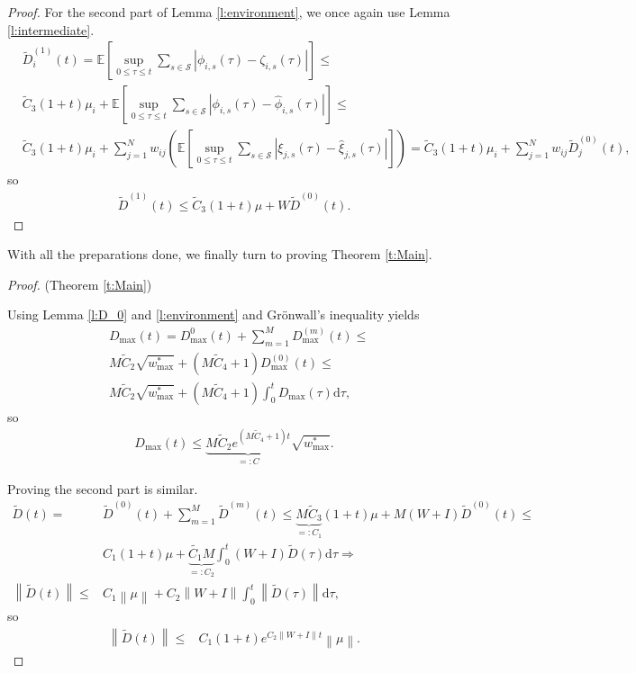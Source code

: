 \documentclass{article}
\newcommand{\E}{\mathbb{E}}
\renewcommand{\d}{\mathrm{d}}
\newcommand{\1}[1]{{\mathds{1}}_{\left\{#1\right\}}}
\renewcommand{\S}{\mathcal{S}}
\newcommand{\remm}[1]{{#1}}
\begin{document}
\begin{proof}
		For the second part of Lemma \ref{l:environment}, we once again use Lemma \ref{l:intermediate}.
		\begin{align*}
			&\tilde{D}_{i}^{(1)}(t)= \E \left[\sup_{0 \leq \tau \leq t} \sum_{s \in \S}  \left| \phi_{i,s}(\tau)-\zeta_{i,s}(\tau) \right| \right] \leq \\
			& \tilde{C}_3\remm{(1+t)}\mu_{i}+ \E \left[\sup_{0 \leq \tau \leq t} \sum_{s \in \S}  \left| \phi_{i,s}(\tau)-\hat{\phi}_{i,s}(\tau) \right| \right] \leq\\
			& \tilde{C}_3\remm{(1+t)}\mu_{i}+\sum_{j=1}^{N} w_{ij} \left( \E \left[\sup_{0 \leq \tau \leq t} \sum_{s \in \S}  \left| \xi_{j,s}(\tau)-\hat{\xi}_{j,s}(\tau) \right| \right] \right)=\tilde{C}_3\remm{(1+t)} \mu_i+\sum_{j=1}^N w_{ij}\tilde{D}_{j}^{(0)}(t),
		\end{align*}
		so
		\begin{align*}
			\tilde{D}^{(1)}(t) \leq \tilde{C}_3\remm{(1+t)} \mu+W \tilde{D}^{(0)}(t).
		\end{align*}
	\end{proof}	
	
	With all the preparations done, we finally turn to proving Theorem \ref{t:Main}.
	\begin{proof}(Theorem \ref{t:Main})
		
		Using Lemma \ref{l:D_0} and \ref{l:environment} and Grönwall's inequality yields
		\begin{align*}
			&D_{\max}(t)=D_{\max}^{0}(t)+\sum_{m=1}^{M} D_{\max}^{(m)}(t) \leq\\
			& M\tilde{C}_2 \sqrt{\remm{w_{\max}^{*}}}+\left(M \tilde{C}_4+1 \right)D_{\max}^{(0)}(t) \leq\\
			& M\tilde{C}_2 \sqrt{\remm{w_{\max}^{*}}}+\left(M \tilde{C}_4+1 \right)\int_{0}^{t}D_{\max}(\tau) \d \tau,
		\end{align*}
		so
		\begin{align*}
			D_{\max}(t) \leq  \underbrace{M \tilde{C}_2e^{\left(M \tilde{C}_4+1 \right)t}}_{=:C} \sqrt{\remm{w_{\max}^{*}}}. 
		\end{align*}
		
		Proving the second part is similar.
		\begin{align*}
			\tilde{D}(t)=&\tilde{D}^{(0)}(t)+\sum_{m=1}^{M}\tilde{D}^{(m)}(t) \leq \underbrace{M \tilde{C}_3}_{=:C_1}\remm{(1+t)}\mu +M \left(W+I\right)\tilde{D}^{(0)}(t) \leq \\
			&C_1 \remm{(1+t)} \mu+ \underbrace{\tilde{C_1}M}_{=:C_2} \int_{0}^{t}\left(W+I\right)\tilde{D}(\tau) \d \tau \Rightarrow \\
			\left \|\tilde{D} (t)\right \| \leq & C_1 \left \| \mu \right \|+C_2 \left\|W+I \right\|\int_{0}^{t} \left \|\tilde{D}(\tau) \right \| \d \tau,
		\end{align*}
		so
		\begin{align*}
			\left \|\tilde{D} (t)\right \| \leq & C_1\remm{(1+t)}e^{C_2 \left\|W+I \right\| t} \left \| \mu \right \|.
		\end{align*}
	\end{proof}
	
\end{document}
